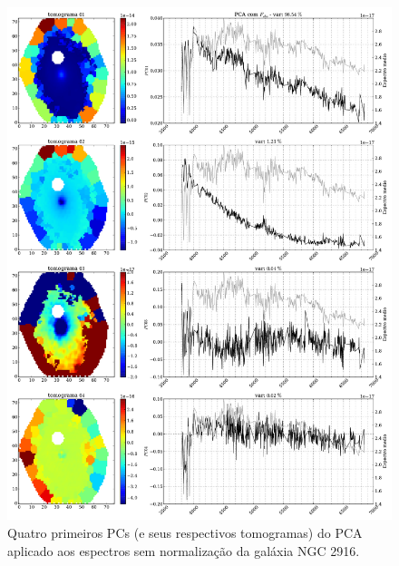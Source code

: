 \begin{figure}
    \includegraphics[width=1.\textwidth]{figuras/K0277-tomo1a4.pdf}
    \caption[Tomogramas de 1 a 4 da gal\'axia NGC 2916 - $F_{obs}$.]
    {Quatro primeiros PCs (e seus respectivos tomogramas) do PCA aplicado aos espectros sem normalização da galáxia
    NGC 2916.}
    \label{fig:UsoPCA:K277tomofobs}
\end{figure}
